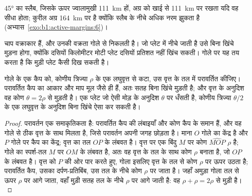 \ang{45} का स्लैब, जिसके ऊपर ज्वालामुखी \qty{111}{km} हों, अग्र को खाई से \qty{111}{km} पर रखता यदि वह सीधा होता; कुरील अग्र \qty{164}{km} पर है क्योंकि स्लैब  के नीचे अधिक नरम झुकता है (अभ्यास~\ref{exo:b1:active-margins:6})।

चाप वक्राकार हैं, और उनकी वक्रता गोले से निकलती है। जो प्लेट  में नीचे जाती है उसे बिना खिंचे मुड़ना होगा, क्योंकि दसियों किलोमीटर मोटी प्लेट दसियों प्रतिशत नहीं खिंच सकती। गोले पर यह तय करता है कि मुड़ी प्लेट कैसी दिख सकती है।

\begin{proposition}[एक मुड़ा गोलीय कवच]\label{prop:b1:active-margins:shell}
गोले के एक कैप को, कोणीय त्रिज्या $\rho$ के एक लघुवृत्त से कटा, उस वृत्त के तल में परावर्तित कीजिए। परावर्तित कैप का आकार और माप मूल जैसे ही हैं, अतः सतह बिना खिंचे मुड़ती है; और वृत्त के अनुदिश वह कोण $\theta = 2\rho$ से मुड़ती है। एक प्लेट जो ऐसी मोड़ के अनुदिश  $\theta$ पर धँसती है, कोणीय त्रिज्या $\theta/2$ के एक लघुवृत्त के अनुदिश बिना खिंचे ऐसा कर सकती है।
\end{proposition}

\begin{proof}
परावर्तन एक समाकृतिकता है: परावर्तित कैप की लंबाइयाँ और कोण कैप के समान हैं, और वह गोले से ठीक वृत्त के साथ मिलता है, जिसे परावर्तन अपनी जगह छोड़ता है। माना $O$ गोले का केंद्र है और $P$ गोले पर कैप का केंद्र; वृत्त का तल $OP$ के लंबवत है। वृत्त पर एक बिंदु $M$ पर कोण $\widehat{MOP}$ $\rho$ है; गोले का स्पर्श-तल $M$ पर $OM$ के लंबवत है, अतः वह वृत्त के तल के साथ कोण $\rho$ बनाता है, जो $OP$ के लंबवत है। वृत्त को $P$ की ओर पार करते हुए, गोला इसलिए वृत्त के तल से कोण $\rho$ पर ऊपर उठता है; परावर्तित कैप, उसका दर्पण-प्रतिबिंब, उस तल के नीचे कोण $\rho$ पर जाता है। जहाँ अमुड़ा गोला तल से ऊपर $\rho$ पर आगे जाता, वहाँ मुड़ी सतह तल के नीचे $\rho$ पर आगे जाती है: वह $\rho + \rho = 2\rho$ से मुड़ी है।
\end{proof}

